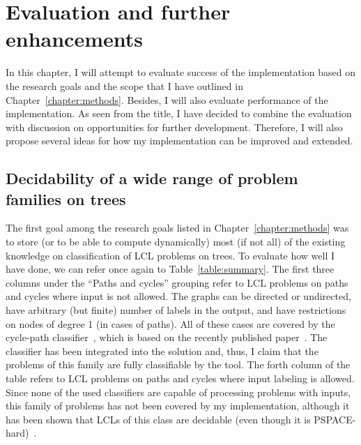 \chapter{Evaluation and further enhancements}
\label{chapter:evaluation}

In this chapter, I will attempt to evaluate success of the implementation
based on the research goals and the scope that I have outlined in Chapter~\ref{chapter:methods}.
Besides, I will also evaluate performance of the implementation.
As seen from the title,
I have decided to combine the evaluation with discussion on opportunities for further
development. Therefore, I will also propose several ideas for how my implementation
can be improved and extended.

\section{Decidability of a wide range of problem families on trees}

The first goal among the research goals listed in Chapter~\ref{chapter:methods}
was to store (or to be able to compute dynamically) most
(if not all) of the existing knowledge on classification of LCL problems on trees.
To evaluate how well I have done, we can refer once again to Table~\ref{table:summary}.
The first three columns under the ``Paths and cycles'' grouping refer to LCL problems on
paths and cycles where input is not allowed. The graphs can be directed or undirected,
have arbitrary (but finite) number of labels in the output, and have restrictions
on nodes of degree 1 (in cases of paths). All of these cases are covered by
the cycle-path classifier~\cite{Tereshchenko2020}, which is based on the recently
published paper~\cite{Chang2020}. The classifier has been integrated into the
solution and, thus, I claim that the problems of this family are fully classifiable by the tool.
The forth column of the table refers to LCL problems on paths and cycles
where input labeling is allowed. Since none of the used classifiers
are capable of processing problems with inputs, this family of problems
has not been covered by my implementation, although it has been shown that
LCLs of this class are decidable (even though it is PSPACE-hard)~\cite{Balliu2018}.

